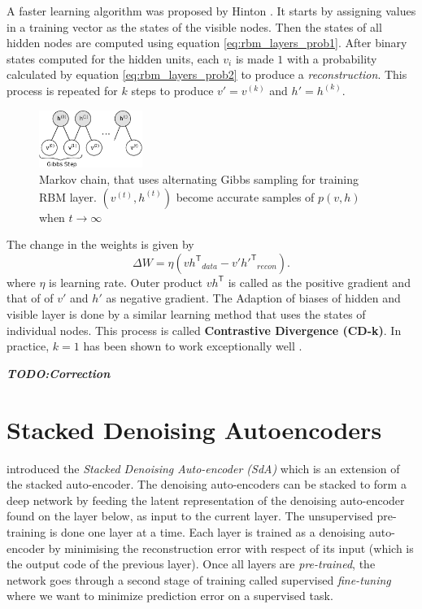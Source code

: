 A faster learning algorithm was proposed by Hinton \cite{hinton2002training,hinton2006reducing,hinton2010practical}. It starts by assigning values in a training vector as the states of the visible nodes. Then the states of all hidden nodes are computed using equation \ref{eq:rbm_layers_prob1}. After binary states computed for the hidden units, each $v_i$ is made $1$ with a probability calculated by equation \ref{eq:rbm_layers_prob2} to produce a \textit{reconstruction}. This process is repeated for $k$ steps to produce $v'= v^{(k)}$ and $h' = h^{(k)}$. 

\begin{figure}[ht]
\centering
\includegraphics[width=0.3\textwidth]{./imgs/markov_chain.png}
\caption[Markov chain of training RBM layer]{Markov chain, that uses alternating Gibbs sampling for training RBM layer. $(v^{(t)}, h^{(t)})$ become accurate samples of $p(v,h)$ when $t \rightarrow \infty$}
\label{fig:rbmmarkovChain}
\end{figure}

The change in the weights is given by
$$ \Delta W = \eta ({vh^\mathsf{T}}_{data} - {v'h'^{\mathsf{T}}}_{recon}). $$
where $\eta$ is learning rate. Outer product $vh^\mathsf{T}$ is called as the positive gradient and that of of $v'$ and $h'$ as negative gradient. The Adaption of biases of hidden and visible layer is done by a similar learning method that uses the states of individual nodes. This process is called \textbf{Contrastive Divergence (CD-k)}. In practice, $k=1$ has been shown to work exceptionally well \cite{hinton2010practical}.

\textit{\textbf{TODO:Correction}}

\section{Stacked Denoising Autoencoders}
\citet{vincent2010stacked} introduced the \emph{Stacked Denoising Auto-encoder (SdA)} which is an extension of the stacked auto-encoder. The denoising auto-encoders can be stacked to form a deep network by feeding the latent representation of the denoising auto-encoder found on the layer below, as input to the current layer. The unsupervised pre-training is done one layer at a time. Each layer is trained as a denoising auto-encoder by minimising the reconstruction error with respect of its input (which is the output code of the previous layer). Once all layers are \textit{pre-trained}, the network goes through a second stage of training called supervised \textit{fine-tuning} where we want to minimize prediction error on a supervised task.

